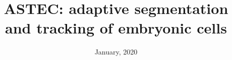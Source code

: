\documentclass{report}
\begin{document}
\title{ASTEC: adaptive segmentation and tracking of embryonic cells}
\author{}
\date{January, 2020}
\maketitle

\tableofcontents



% 









\end{document}
